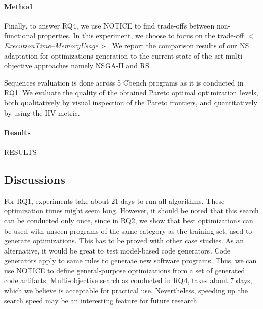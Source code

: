 \paragraph{Method}

Finally, to answer RQ4, we use NOTICE to find trade-offs between non-functional properties. In this experiment, we choose to focus on the trade-off \textit{$<$ExecutionTime--MemoryUsage$>$}. We report the comparison results of our NS adaptation for optimizations generation to the current state-of-the-art multi-objective approaches namely NSGA-II and RS. 
  
Sequences evaluation is done across 5 Cbench programs as it is conducted in RQ1.
We evaluate the quality of the obtained Pareto optimal optimization levels, both qualitatively by visual inspection of the Pareto frontiers, and quantitatively by using the HV metric.



\paragraph{Results}
RESULTS

\noindent{}
\subsection{Discussions}
For RQ1, experiments take about 21 days to run all algorithms. These optimization times might seem long. However, it should be noted that this search can be conducted only once, since in RQ2, we show that best optimizations can be used with unseen programs of the same category as the training set, used to generate optimizations. This has to be proved with other case studies. As an alternative, it would be great to test model-based code generators. Code generators apply to same rules to generate new software programs. Thus, we can use NOTICE to define general-purpose optimizations from a set of generated code artifacts. 
Multi-objective search as conducted in RQ4, takes about 7 days, which we believe is acceptable for practical use. Nevertheless, speeding up the search speed
may be an interesting feature for future research.



